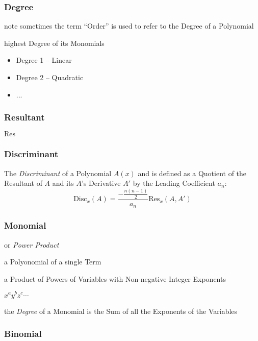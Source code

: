 \subsubsection{Degree}\label{sec:degree}

note sometimes the term ``Order'' is used to refer to the Degree of a
Polynomial

highest Degree of its Monomials

\begin{itemize}
  \item Degree 1 -- Linear
  \item Degree 2 -- Quadratic
  \item ...
\end{itemize}



\subsubsection{Resultant}\label{sec:resultant}

$\mathrm{Res}$



\subsubsection{Discriminant}\label{sec:discriminant}

The \emph{Discriminant} of a Polynomial $A(x)$ and is defined as a Quotient of
the Resultant of $A$ and its $A$'s Derivative $A'$ by the Leading Coefficient
$a_n$:
\[
  \mathrm{Disc}_x(A) = \frac{-\frac{n(n-1)}{2}}{a_n} \mathrm{Res}_x(A, A')
\]



\subsubsection{Monomial}\label{sec:monomial}

or \emph{Power Product}

a Polyonomial of a single Term

a Product of Powers of Variables with Non-negative Integer Exponents

$x^a y^b z^c \cdots$

the \emph{Degree} of a Monomial is the Sum of all the Exponents of the
Variables



\subsubsection{Binomial}\label{sec:binomial}

